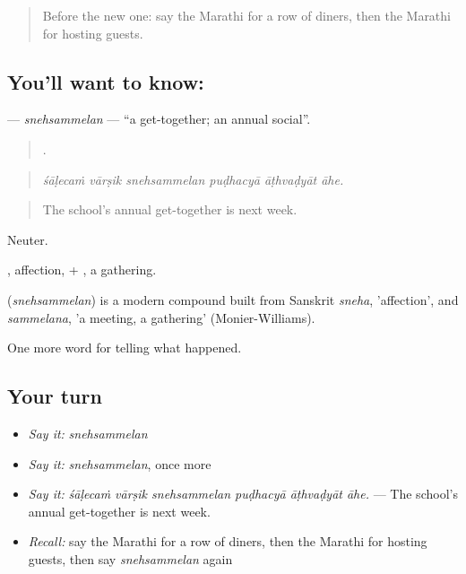 \label{lesson:MR-C321-snehsammelan}



\begin{quote}
Before the new one: say the Marathi for a row of diners, then the Marathi for hosting guests.
\end{quote}

\subsection*{You'll want to know: }
\textbf{} — \emph{snehsammelan} — \textquotedblleft{}a get-together; an annual social\textquotedblright{}.

\begin{quote}
     .
\end{quote}

\begin{quote}
\emph{śāḷecaṁ vārṣik snehsammelan puḍhacyā āṭhvaḍyāt āhe.}
\end{quote}

\begin{quote}
The school's annual get-together is next week.
\end{quote}

Neuter.

, affection, + , a gathering.

\begin{cousinweb}
\textbf{} (\emph{snehsammelan}) is a modern compound built from Sanskrit \emph{sneha}, 'affection', and \emph{sammelana}, 'a meeting, a gathering' (Monier-Williams).
\end{cousinweb}

\begin{grammarlens}[title={What you've built}]
One more word for telling what happened.
\end{grammarlens}

\subsection*{Your turn}
\begin{itemize}
\raggedright
  \item \emph{Say it:} \emph{snehsammelan}
  \item \emph{Say it:} \emph{snehsammelan}, once more
  \item \emph{Say it:} \emph{śāḷecaṁ vārṣik snehsammelan puḍhacyā āṭhvaḍyāt āhe.} — The school's annual get-together is next week.
  \item \emph{Recall:} say the Marathi for a row of diners, then the Marathi for hosting guests, then say \emph{snehsammelan} again
\end{itemize}

